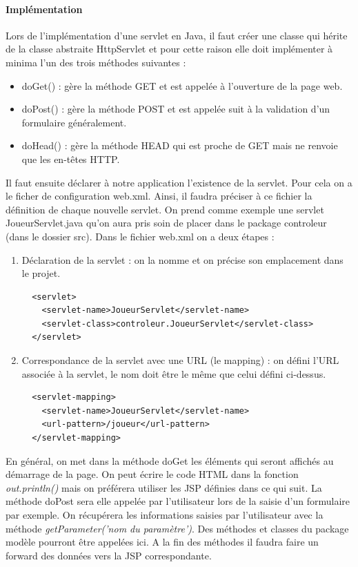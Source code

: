 \paragraph{Implémentation}
Lors de l'implémentation d'une servlet en Java, il faut créer une classe qui hérite de la classe abstraite HttpServlet et pour cette raison elle doit implémenter à
minima l'un des trois méthodes suivantes :
\begin{itemize}
 \item doGet() : gère la méthode GET et est appelée à l'ouverture de la page web.
 \item doPost() : gère la méthode POST et est appelée suit à la validation d'un formulaire généralement.
 \item doHead() : gère la méthode HEAD qui est proche de GET mais ne renvoie que les en-têtes HTTP.
\end{itemize}
Il faut ensuite déclarer à notre application l'existence de la servlet. Pour cela on a le ficher de configuration web.xml. Ainsi, il faudra préciser à ce fichier la définition de chaque nouvelle servlet.
On prend comme exemple une servlet JoueurServlet.java qu'on aura pris soin de placer dans le package controleur (dans le dossier src). Dans le fichier web.xml on a deux étapes :
\begin{enumerate}
 \item Déclaration de la servlet : on la nomme et on précise son emplacement dans le projet.
\begin{lstlisting}
  <servlet>
    <servlet-name>JoueurServlet</servlet-name>
    <servlet-class>controleur.JoueurServlet</servlet-class>
  </servlet>
\end{lstlisting}  
 \item Correspondance de la servlet avec une URL (le mapping) : on défini l'URL associée à la servlet, le nom doit être le même que celui défini ci-dessus.
\begin{lstlisting}
  <servlet-mapping>
    <servlet-name>JoueurServlet</servlet-name>
    <url-pattern>/joueur</url-pattern>
  </servlet-mapping>
\end{lstlisting}  
\end{enumerate}

En général, on met dans la méthode doGet les éléments qui seront affichés au démarrage de la page. On peut écrire le code HTML dans la fonction \textit{out.println()} mais on préférera utiliser les JSP définies dans ce qui suit. La méthode doPost sera elle appelée par l'utilisateur lors de la saisie d'un formulaire par exemple. On récupérera les informations saisies par l'utilisateur avec la méthode \textit{getParameter('nom du paramètre')}.
Des méthodes et classes du package modèle pourront être appelées ici. A la fin des méthodes il faudra faire un forward des données vers la JSP correspondante.\\

